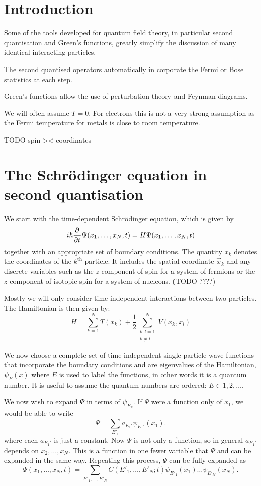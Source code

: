 \chapter{Introduction}
Some of the tools developed for quantum field theory, in particular second quantisation and Green's functions, greatly simplify the discussion of many identical interacting particles.

The second quantised operators automatically in corporate the Fermi or Bose statistics at each step.

Green's functions allow the use of perturbation theory and Feynman diagrams.

We will often assume $T=0$. For electrons this is not a very strong assumption as the Fermi temperature for metals is close to room temperature.

TODO spin >< coordinates

\chapter{The Schrödinger equation in second quantisation}
We start with the time-dependent Schrödinger equation, which is given by
\[ i\hbar  \frac{\partial{^{}}}{\partial{{t}^{}}} \Psi(x_1, \ldots, x_N, t) = H\Psi(x_1, \ldots, x_N, t) \]
together with an appropriate set of boundary conditions. The quantity $x_k$ denotes the coordinates of the $k^\text{th}$ particle. It includes the spatial coordinate $\vec{x}_k$ and any discrete variables such as the $z$ component of spin for a system of fermions or the $z$ component of isotopic spin for a system of nucleons. (TODO ????)

Mostly we will only consider time-independent interactions between two particles. The Hamiltonian is then given by:
\[ H = \sum^N_{k=1}T(x_k) + \frac{1}{2}\sum^N_{\substack{k,l=1 \\ k \neq l}}V(x_k,x_l) \]

We now choose a complete set of time-independent single-particle wave functions that incorporate the boundary conditions and are eigenvalues of the Hamiltonian, $\psi_{E}(x)$ where $E$ is used to label the functions, in other words it is a quantum number.  It is useful to assume the quantum numbers are ordered: $E \in 1,2,\ldots$.

We now wish to expand $\Psi$ in terms of $\psi_{E_k}$. If $\Psi$ were a function only of $x_1$, we would be able to write
\[ \Psi = \sum_{E'_1}a_{E_1'}\psi_{E_1'}(x_1). \]
where each $a_{E_1'}$ is just a constant. Now $\Psi$ is not only a function, so in general $a_{E_1'}$ depends on $x_2,\ldots, x_N$. This is a function in one fewer variable that $\Psi$ and can be expanded in the same way. Repeating this process, $\Psi$ can be fully expanded as
\begin{equation}
\Psi(x_1, \ldots, x_N, t) = \sum_{E'_1, \ldots, E'_N}C(E'_1, \ldots, E'_N;t)\psi_{E'_1}(x_1)\ldots \psi_{E'_N}(x_N). \label{psiExpansion}
\end{equation}


